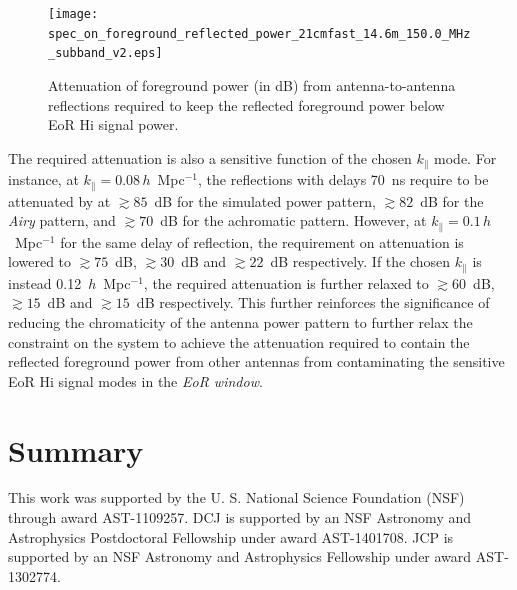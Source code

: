 \documentclass[preprint2,iop,numberedappendix,twocolappendix,appendixfloats]{emulateapj}
\begin{document}
\begin{figure}[htb]
\centering
\texttt{[image: spec\_on\_foreground\_reflected\_power\_21cmfast\_14.6m\_150.0\_MHz\_subband\_v2.eps]}
\caption{Attenuation of foreground power (in dB) from antenna-to-antenna reflections required to keep the reflected foreground power below EoR H{\sc i} signal power.}
\label{fig:fg-reflections}
\end{figure}

The required attenuation is also a sensitive function of the chosen $k_\parallel$ mode. For instance, at $k_\parallel=0.08\,h$~Mpc$^{-1}$, the reflections with delays 70~ns require to be attenuated by at $\gtrsim 85$~dB for the simulated power pattern, $\gtrsim 82$~dB for the {\it Airy} pattern, and $\gtrsim 70$~dB for the achromatic pattern. However, at $k_\parallel=0.1\,h$~Mpc$^{-1}$ for the same delay of reflection, the requirement on attenuation is lowered to $\gtrsim 75$~dB, $\gtrsim 30$~dB and $\gtrsim 22$~dB respectively. If the chosen $k_\parallel$ is instead 0.12~$h$~Mpc$^{-1}$, the required attenuation is further relaxed to $\gtrsim 60$~dB, $\gtrsim 15$~dB and $\gtrsim 15$~dB respectively. This further reinforces the significance of reducing the chromaticity of the antenna power pattern to further relax the constraint on the system to achieve the attenuation required to contain the reflected foreground power from other antennas from contaminating the sensitive EoR H{\sc i} signal modes in the {\it EoR window}.

\section{Summary}\label{sec:summary}

\acknowledgments

This work was supported by the U. S. National Science Foundation (NSF) through award AST-1109257. DCJ is supported by an NSF Astronomy and Astrophysics Postdoctoral Fellowship under award AST-1401708. JCP is supported by an NSF Astronomy and Astrophysics Fellowship under award AST-1302774. 




\end{document}
